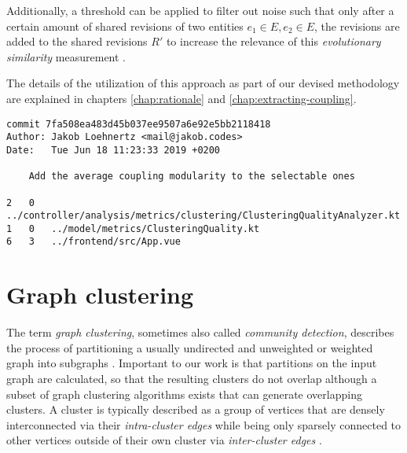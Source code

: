 \documentclass[12pt,a4paper]{report}
\begin{document}
Additionally, a threshold can be applied to filter out noise such that only
after a certain amount of shared revisions of two entities \(e_1 \in E, e_2 \in E\),
the revisions are added to the shared revisions \(R'\) to increase the relevance
of this \textit{evolutionary similarity} measurement \cite{tornhill2015crimescene}.

The details of the utilization of this approach as part of our devised methodology
are explained in chapters \ref{chap:rationale} and \ref{chap:extracting-coupling}.

\smaller
\begin{lstlisting}[caption=Example Git log, label=git-log, breaklines=true]
commit 7fa508ea483d45b037ee9507a6e92e5bb2118418
Author: Jakob Loehnertz <mail@jakob.codes>
Date:   Tue Jun 18 11:23:33 2019 +0200

    Add the average coupling modularity to the selectable ones

2   0   ../controller/analysis/metrics/clustering/ClusteringQualityAnalyzer.kt
1   0   ../model/metrics/ClusteringQuality.kt
6   3   ../frontend/src/App.vue
\end{lstlisting}
\normalsize



\section{Graph clustering} \label{sect:background-graph-clustering}

The term \textit{graph clustering}, sometimes also called \textit{community detection},
describes the process of partitioning a usually undirected
and unweighted or weighted graph into subgraphs \cite{lancichinetti2009community}.
Important to our work is that partitions on the input graph are calculated,
so that the resulting clusters do not overlap although a subset of
graph clustering algorithms exists that can generate overlapping clusters.
A cluster is typically described as a group of vertices that are densely
interconnected via their \textit{intra-cluster edges} while being only sparsely
connected to other vertices outside of their own cluster via
\textit{inter-cluster edges} \cite{lancichinetti2009community, newman2004fast}.
\end{document}
